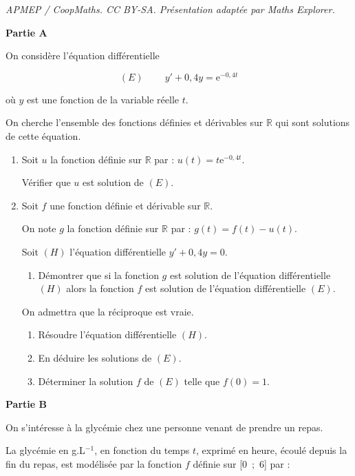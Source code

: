 \documentclass[10pt]{article}
\providecommand{\R}{\mathbb{R}}
\providecommand{\e}{{\mathrm{e}}}
\begin{document}
\noindent\textit{APMEP / CoopMaths. CC BY-SA. Présentation adaptée par Maths Explorer.}\par\medskip
\medskip

\textbf{Partie A}

\medskip

On considère l'équation différentielle

\[(E)\: \qquad y' + 0,4y = \e^{-0,4t}\]

où $y$ est une fonction de la variable réelle $t$.

On cherche l'ensemble des fonctions définies et dérivables sur $\R$ qui sont solutions
de cette équation.

\medskip

\begin{enumerate}
\item Soit $u$ la fonction définie sur $\R$ par : $u(t) = t\e^{-0,4t}$.

Vérifier que $u$ est solution de $(E)$.
\item Soit $f$ une fonction définie et dérivable sur $\R$.

On note $g$ la fonction définie sur $\R$ par : $g(t) = f(t) - u(t)$.

Soit $(H)$ l'équation différentielle $y' + 0,4y = 0$.
	\begin{enumerate}
		\item Démontrer que si la fonction $g$ est solution de l'équation différentielle $(H)$ alors la fonction $f$ est solution de l'équation différentielle $(E)$.
	\end{enumerate}		
		
On admettra que la réciproque est vraie.

	\begin{enumerate}[resume]
		\item Résoudre l'équation différentielle $(H)$.
		\item En déduire les solutions de $(E)$.
		\item Déterminer la solution $f$ de $(E)$ telle que $f(0) = 1$.
	\end{enumerate}
\end{enumerate}

\bigskip

\textbf{Partie B}

\medskip

On s'intéresse à la glycémie chez une personne venant de prendre un repas.

La glycémie en g.L$^{-1}$, en fonction du temps $t$, exprimé en heure, écoulé depuis la fin
du repas, est modélisée par la fonction $f$ définie sur [0~;~6] par :
\end{document}
